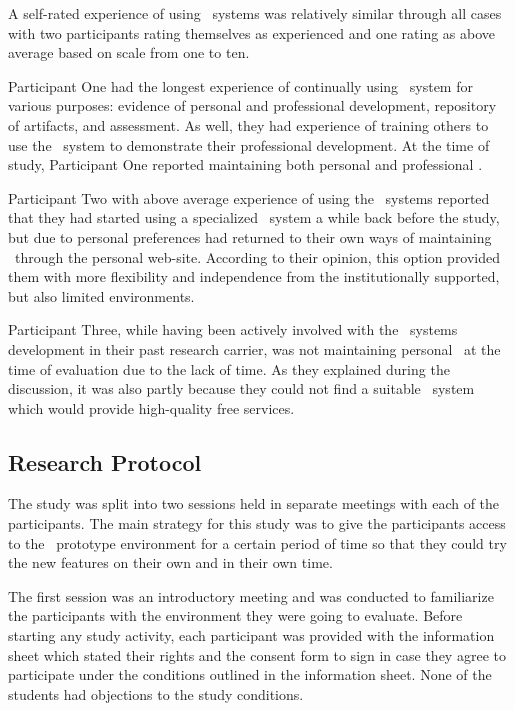 A self-rated experience of using \ep~systems was relatively similar through all
cases with two participants rating themselves as experienced and one rating as
above average based on scale from one to ten.

Participant One had the longest experience of continually using \ep~system for
various purposes: evidence of personal and professional development, repository
of artifacts, and assessment. As well, they had experience of training others to
use the \ep~system to demonstrate their professional development. At the time of
study, Participant One reported maintaining both personal and professional \ep.

Participant Two with above average experience of using the \ep~systems reported
that they had started using a specialized \ep~system a while back before the
study, but due to personal preferences had returned to their own ways of 
maintaining \ep~through the personal web-site. According to their opinion, this
option provided them with more flexibility and independence from the
institutionally supported, but also limited environments.

Participant Three, while having been actively involved with the \ep~systems
development in their past research carrier, was not maintaining personal \ep~at
the time of evaluation due to the lack of time. As they explained during the
discussion, it was also partly because they could not find a suitable \ep~system
which would provide high-quality free services.

\subsection{Research Protocol}

The study was split into two sessions held in separate meetings with each of
the participants. The main strategy for this study was to give the participants
access to the \ep~prototype environment for a certain period of time so that
they could try the new features on their own and in their own time.

The first session was an introductory meeting and was conducted to familiarize
the participants with the environment they were going to evaluate. Before
starting any study activity, each participant was provided with the information
sheet which stated their rights and the consent form to sign in case they agree
to participate under the conditions outlined in the information sheet. None of
the students had objections to the study conditions.

